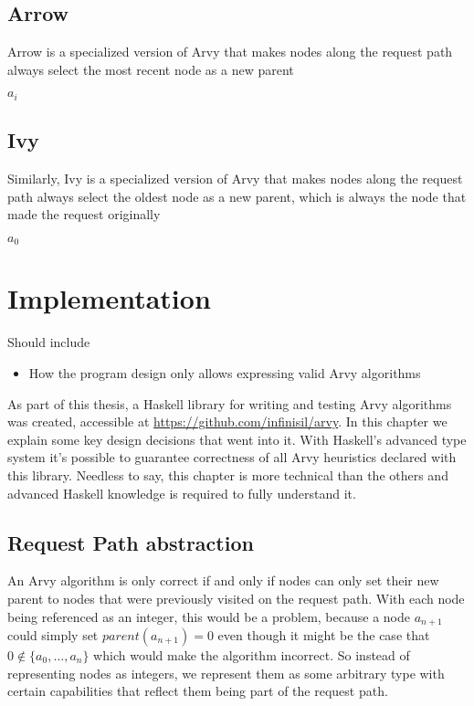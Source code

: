 \documentclass[a4paper, oneside]{discothesis}
\begin{document}
\section{Arrow}

Arrow is a specialized version of Arvy that makes nodes along the request path always select the most recent node as a new parent
\begin{algorithmic}
\State\Return $a_i$
\EndFunction
\end{algorithmic}

\section{Ivy}

Similarly, Ivy is a specialized version of Arvy that makes nodes along the request path always select the oldest node as a new parent, which is always the node that made the request originally
\begin{algorithmic}
\State\Return $a_0$
\EndFunction
\end{algorithmic}

\chapter{Implementation}

Should include
\begin{itemize}
\item How the program design only allows expressing valid Arvy algorithms
\end{itemize}

As part of this thesis, a Haskell library for writing and testing Arvy algorithms was created, accessible at \url{https://github.com/infinisil/arvy}. In this chapter we explain some key design decisions that went into it. With Haskell's advanced type system it's possible to guarantee correctness of all Arvy heuristics declared with this library. Needless to say, this chapter is more technical than the others and advanced Haskell knowledge is required to fully understand it.

\section{Request Path abstraction}

An Arvy algorithm is only correct if and only if nodes can only set their new parent to nodes that were previously visited on the request path. With each node being referenced as an integer, this would be a problem, because a node $a_{n+1}$ could simply set $parent(a_{n+1})=0$ even though it might be the case that $0\notin\{a_0,\dots,a_n\}$ which would make the algorithm incorrect. So instead of representing nodes as integers, we represent them as some arbitrary type with certain capabilities that reflect them being part of the request path.
\end{document}
